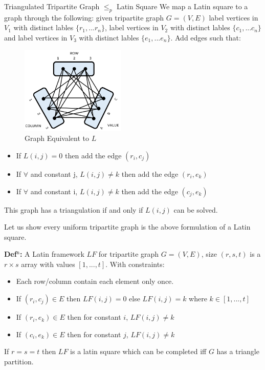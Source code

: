 \documentclass[final]{beamer}
\newlength{\colwidth}
\newcounter{row}
\newcounter{col}
\begin{document}
\begin{frame}[t]
\begin{columns}[t]
\begin{column}{\colwidth}
\begin{block}{Triangulated Tripartite Graph $\leq_p$ Latin Square \cite{COLBOURN198425}}
We map a Latin square to a graph through the following: given tripartite graph $G=(V,E)$ label vertices in $V_1$ with distinct lables $\{r_1,...r_n\}$, label vertices in $V_2$ with distinct lables $\{c_1,...c_n\}$ and label vertices in $V_3$ with distinct lables $\{e_1,...e_n\}$. Add edges such that:

\begin{figure}
		\vspace{-100pt}
		\includegraphics[width=50mm]{ttg.png}
		\caption{Graph Equivalent to $L$}
		\vspace{-30pt}
\end{figure}

\begin{itemize}
\item{If $L(i,j) = 0$ then add the edge $(r_i,c_j)$ }
\item{If $\forall$ and constant j, $L(i,j) \neq k$ then add the edge $(r_i,e_k)$}
\item{If $\forall$ and constant i, $L(i,j) \neq k$ then add the edge $(c_j,e_k)$}
\end{itemize}
This graph has a triangulation if and only if $L(i,j)$ can be solved.

Let us show every uniform tripartite graph is the above formulation of a Latin square.

\textbf{Def$^{\text{n}}$:} A Latin framework $LF$ for tripartite graph $G=(V,E)$, size $(r,s,t)$ is a $r \times s$ array with values $[1,...,t]$. With constraints:
\begin{itemize}
\item{Each row/column contain each element only once.}
\item{If $(r_i,c_j)\in E$ then $LF(i,j)=0$ else $LF(i,j)= k$ where $k\in [1,...,t]$}
\item{If $(r_i,e_k)\in E$  then for constant $i$, $LF(i,j)\neq k$}
\item{If $(c_i,e_k)\in E$  then for constant $j$, $LF(i,j)\neq k$}
\end{itemize}
If $r=s=t$ then $LF$ is a latin square which can be completed iff $G$ has a triangle partition.


\end{block}
\end{column}
\end{columns}
\end{frame}
\end{document}
